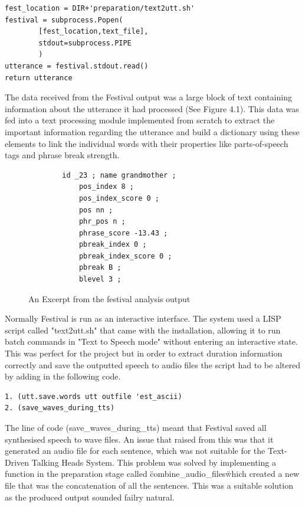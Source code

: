 \documentclass[bsc,frontabs,twoside,singlespacing,parskip]{infthesis}
\begin{document}
\begin{lstlisting}
fest_location = DIR+'preparation/text2utt.sh'
festival = subprocess.Popen(
		[fest_location,text_file], 
		stdout=subprocess.PIPE
		)
utterance = festival.stdout.read()
return utterance
\end{lstlisting}

The data received from the Festival output was a large block of text containing information about the utterance it had processed (See Figure 4.1). This data was fed into a text processing module implemented from scratch to extract the important information regarding the utterance and build a dictionary using these elements to link the individual words with their properties like parts-of-speech tags and phrase break strength.

\begin{figure}
	\begin{lstlisting}
		id _23 ; name grandmother ;
			pos_index 8 ;
			pos_index_score 0 ;
			pos nn ; 
			phr_pos n ; 
			phrase_score -13.43 ; 
			pbreak_index 0 ; 
			pbreak_index_score 0 ; 
			pbreak B ; 
			blevel 3 ; 
	\end{lstlisting}
	\caption{An Excerpt from the festival analysis output}
\end{figure}


Normally Festival is run as an interactive interface. The system used a LISP script called "text2utt.sh" that came with the installation, allowing it to run batch commands in "Text to Speech mode" without entering an interactive state. This was perfect for the project but in order to extract duration information correctly and save the outputted speech to audio files the script had to be altered by adding in the following code. 

\begin{lstlisting}
1. (utt.save.words utt outfile 'est_ascii) 
2. (save_waves_during_tts)
\end{lstlisting}

The line of code (save\_waves\_during\_tts) meant that Festival saved all synthesised speech to wave files. An issue that raised from this was that it generated an audio file for each sentence, which was not suitable for the Text-Driven Talking Heads System. This problem was solved by implementing a function in the preparation stage called \"combine\_audio\_files\" which created a new file that was the concatenation of all the sentences. This was a suitable solution as the produced output sounded failry natural.
\end{document}
